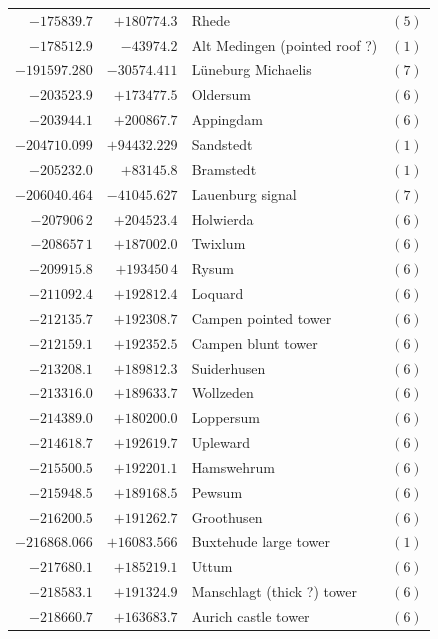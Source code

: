 \begin{center}
\begin{tabular}{r|r|p{170pt}|r}
\(-175839.7\)&\(+180774.3\)&Rhede&\((5)\)\\
\(-178512.9\)&\(-43974.2\)&Alt Medingen (pointed roof ?)&\((1)\)\\
\(-191597.280\)&\(-30574.411\)&Lüneburg Michaelis&\((7)\)\\
\(-203523.9\)&\(+173477.5\)&Oldersum&\((6)\)\\
\(-203944.1\)&\(+200867.7\)&Appingdam&\((6)\)\\
\(-204710.099\)&\(+94432.229\)&Sandstedt&\((1)\)\\
\(-205232.0\)&\(+83145.8\)&Bramstedt&\((1)\)\\
\(-206040.464\)&\(-41045.627\)&Lauenburg signal&\((7)\)\\
\(-207906\,2\)&\(+204523.4\)&Holwierda&\((6)\)\\
\(-208657\,1\)&\(+187002.0\)&Twixlum&\((6)\)\\
\(-209915.8\)&\(+193450\,4\)&Rysum&\((6)\)\\
\(-211092.4\)&\(+192812.4\)&Loquard&\((6)\)\\
\(-212135.7\)&\(+192308.7\)&Campen pointed tower&\((6)\)\\
\(-212159.1\)&\(+192352.5\)&Campen blunt tower&\((6)\)\\
\(-213208.1\)&\(+189812.3\)&Suiderhusen&\((6)\)\\
\(-213316.0\)&\(+189633.7\)&Wollzeden&\((6)\)\\
\(-214389.0\)&\(+180200.0\)&Loppersum&\((6)\)\\
\(-214618.7\)&\(+192619.7\)&Upleward&\((6)\)\\
\(-215500.5\)&\(+192201.1\)&Hamswehrum&\((6)\)\\
\(-215948.5\)&\(+189168.5\)&Pewsum&\((6)\)\\
\(-216200.5\)&\(+191262.7\)&Groothusen&\((6)\)\\
\(-216868.066\)&\(+16083.566\)&Buxtehude large tower&\((1)\)\\
\(-217680.1\)&\(+185219.1\)&Uttum&\((6)\)\\
\(-218583.1\)&\(+191324.9\)&Manschlagt (thick ?) tower&\((6)\)\\
\(-218660.7\)&\(+163683.7\)&Aurich castle tower&\((6)\)\\
\hline\end{tabular}\endgroup\end{center}
\clearpage
